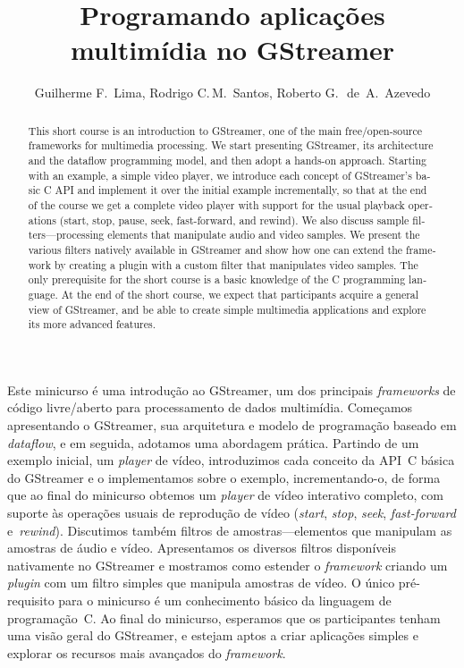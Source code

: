 \documentclass{SBCbookchapter}
\title{Programando aplicações multimídia no GStreamer}
\author{%
  Guilherme F\null.~Lima,
  Rodrigo C\null.\,M.~Santos,
  Roberto G\null.\,~de~A.~Azevedo
}
\def\en#1{\foreignlanguage{english}{\emph{#1}}}
\begin{document}
\maketitle
{}\baselineskip\strut
\begin{abstract}
  \begin{otherlanguage}{english}
    This short course is an introduction to GStreamer, one of the main
    free/open-source frameworks for multimedia processing.  We start
    presenting GStreamer, its architecture and the dataflow programming
    model, and then adopt a hands-on approach.  Starting with an example, a
    simple video player, we introduce each concept of GStreamer’s basic C
    API and implement it over the initial example incrementally, so that at
    the end of the course we get a complete video player with support for
    the usual playback operations (start, stop, pause, seek, fast-forward,
    and rewind).  We also discuss sample filters---processing elements that
    manipulate audio and video samples.  We present the various filters
    natively available in GStreamer and show how one can extend the
    framework by creating a plugin with a custom filter that manipulates
    video samples.  The only prerequisite for the short course is a basic
    knowledge of the C programming language.  At the end of the short
    course, we expect that participants acquire a general view of GStreamer,
    and be able to create simple multimedia applications and explore its
    more advanced features.
  \end{otherlanguage}
\end{abstract}
\begin{resumo}
  Este minicurso é uma introdução ao GStreamer, um dos principais
  \en{frameworks} de código livre/aberto para processamento de dados
  multimídia.  Começamos apresentando o GStreamer, sua arquitetura e modelo
  de programação baseado em \en{dataflow}, e em seguida, adotamos uma
  abordagem prática.  Partindo de um exemplo inicial, um \en{player} de
  vídeo, introduzimos cada conceito da API~C básica do GStreamer e o
  implementamos sobre o exemplo, incrementando-o, de forma que ao final do
  minicurso obtemos um \en{player} de vídeo interativo completo, com suporte
  às operações usuais de reprodução de vídeo (\en{start}, \en{stop},
  \en{seek}, \en{fast-forward} e~\en{rewind}).  Discutimos também filtros de
  amostras---elementos que manipulam as amostras de áudio e vídeo.
  Apresentamos os diversos filtros disponíveis nativamente no GStreamer e
  mostramos como estender o \en{framework} criando um \en{plugin} com um
  filtro simples que manipula amostras de vídeo.  O único pré-requisito para
  o minicurso é um conhecimento básico da linguagem de programação~C\null.
  Ao final do minicurso, esperamos que os participantes tenham uma visão
  geral do GStreamer, e estejam aptos a criar aplicações simples e explorar
  os recursos mais avançados do \en{framework}.
\end{resumo}
\end{document}
